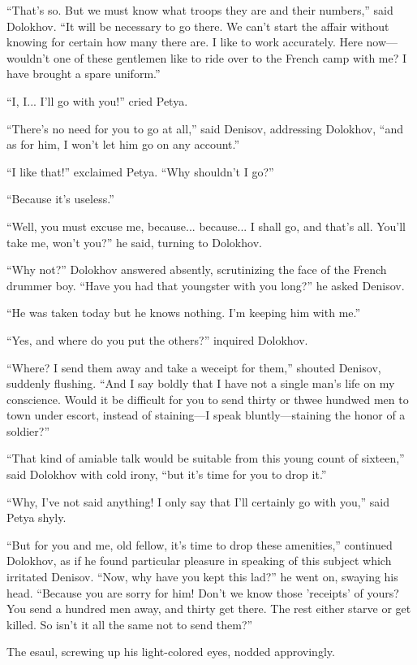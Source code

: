 ``That's so. But we must know what troops they are and their
numbers,'' said Dolokhov. ``It will be necessary to go there. We
can't start the affair without knowing for certain how many there
are. I like to work accurately. Here now---wouldn't one of these
gentlemen like to ride over to the French camp with me? I have
brought a spare uniform.''

``I, I... I'll go with you!'' cried Petya.

``There's no need for you to go at all,'' said Denisov,
addressing Dolokhov, ``and as for him, I won't let him go on any
account.''

``I like that!'' exclaimed Petya. ``Why shouldn't I go?''

``Because it's useless.''

``Well, you must excuse me, because... because... I shall go, and
that's all. You'll take me, won't you?'' he said, turning to
Dolokhov.

``Why not?'' Dolokhov answered absently, scrutinizing the face of
the French drummer boy. ``Have you had that youngster with you
long?'' he asked Denisov.

``He was taken today but he knows nothing. I'm keeping him with
me.''

``Yes, and where do you put the others?'' inquired Dolokhov.

``Where? I send them away and take a weceipt for them,'' shouted
Denisov, suddenly flushing. ``And I say boldly that I have not a
single man's life on my conscience. Would it be difficult for you
to send thirty or thwee hundwed men to town under escort, instead
of staining---I speak bluntly---staining the honor of a
soldier?''

``That kind of amiable talk would be suitable from this young
count of sixteen,'' said Dolokhov with cold irony, ``but it's
time for you to drop it.''

``Why, I've not said anything! I only say that I'll certainly go
with you,'' said Petya shyly.

``But for you and me, old fellow, it's time to drop these
amenities,'' continued Dolokhov, as if he found particular
pleasure in speaking of this subject which irritated
Denisov. ``Now, why have you kept this lad?''  he went on,
swaying his head. ``Because you are sorry for him! Don't we know
those 'receipts' of yours? You send a hundred men away, and
thirty get there. The rest either starve or get killed. So isn't
it all the same not to send them?''

The esaul, screwing up his light-colored eyes, nodded
approvingly.

